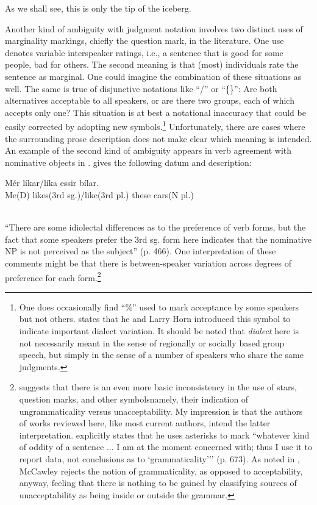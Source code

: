 \noindent
As we shall see, this is only the tip of the iceberg.

Another kind of ambiguity with judgment notation involves two distinct uses of marginality markings, chiefly the question mark, in the literature. One use denotes variable interspeaker ratings, i.e., a sentence that is good for some people, bad for others. The second meaning is that (most) individuals rate the sentence as marginal. One could imagine the combination of these situations as well. The same is true of disjunctive notations like ``/'' or ``\{\}'': Are both alternatives acceptable to all speakers, or are there two groups, each of which accepts only one? This situation is at best a notational inaccuracy that could be easily corrected by adopting new symbols.\footnote{One does occasionally find ``\%'' used to mark acceptance by some speakers but not others. \citet{Neubauer1976} states that he and Larry Horn introduced this symbol to indicate important dialect variation. It should be noted that \textit{dialect} here is not necessarily meant in the sense of regionally or 
socially based group speech, but simply in the sense of a number of speakers who share the same judgments.
}
 Unfortunately, there are cases where the surrounding
prose description does not make clear which meaning is intended. An example of the second kind of ambiguity appears in verb agreement with nominative objects in . \citet{Thrainsson1979} gives the following datum and description:

\ea\label{ex:2:9}
\gll Mér {líkar/líka} {\th}essir bílar.\\
{Me(D)} {likes(3rd sg.)/like(3rd pl.)} these cars(N{ }pl.)\\
\glt [= Thráinsson's (3), p. 466]\\
 \z

\noindent
``There are some idiolectal differences as to the preference of verb forms, but the fact that some speakers prefer the 3rd sg. form here indicates that the nominative NP is not perceived as the subject'' (p. 466). One interpretation of these comments might be that there is between-speaker variation across degrees of preference for each form.\footnote{\citet{Newmeyer1983} suggests that there is an even more basic inconsistency in the use of stars, question marks, and other symbols\schdash{}namely, their indication of ungrammaticality versus unacceptability. My impression is that the authors of works reviewed here, like most current authors, intend the latter interpretation. \citet{McCawley1985} explicitly states that he uses asterisks to mark ``whatever kind of oddity of a sentence ... I am at the moment concerned with; thus I use it to report data, not conclusions as to `grammaticality\textquoteright{}'' (p. 673). As noted in , McCawley rejects the notion of grammaticality, as opposed to acceptability, anyway, feeling that there is nothing to be gained by classifying sources of unacceptability as being inside or outside the grammar.
}


